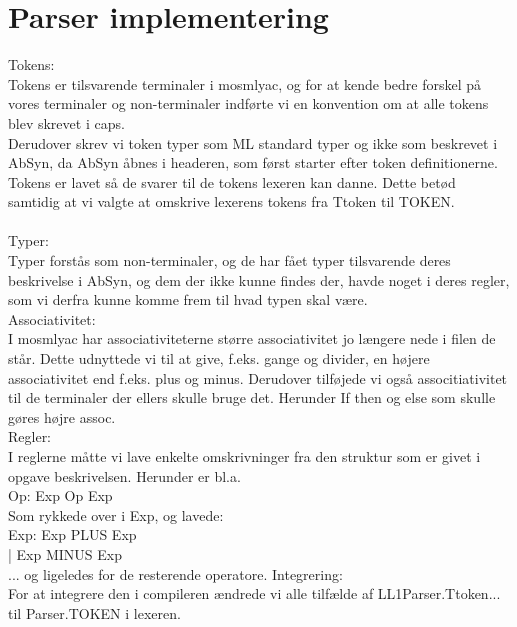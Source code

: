 \documentclass[11pt,a4paper]{article}
\begin{document}
\section*{Parser implementering}
\label{sec:implementation}
Tokens:\\
Tokens er tilsvarende terminaler i mosmlyac, og for at kende bedre forskel på vores terminaler og non-terminaler indførte vi en konvention om at alle tokens blev skrevet i caps.\\
Derudover skrev vi token typer som ML standard typer og ikke som beskrevet i AbSyn, da AbSyn åbnes i headeren, som først starter efter token definitionerne.\\
Tokens er lavet så de svarer til de tokens lexeren kan danne. Dette betød samtidig at vi valgte at omskrive lexerens tokens fra Ttoken til TOKEN.\\
\\
Typer:\\
Typer forstås som non-terminaler, og de har fået typer tilsvarende deres beskrivelse i AbSyn, og dem der ikke kunne findes der, havde noget i deres regler, som vi derfra kunne komme frem til hvad typen skal være.
\\
Associativitet:\\
I mosmlyac har associativiteterne større associativitet jo længere nede i filen de står. Dette udnyttede vi til at give, f.eks. gange og divider, en højere associativitet end f.eks. plus og minus. Derudover tilføjede vi også associtiativitet til de terminaler der ellers skulle bruge det. Herunder If then og else som skulle gøres højre assoc.\\
Regler:\\
I reglerne måtte vi lave enkelte omskrivninger fra den struktur som er givet i opgave beskrivelsen. Herunder er bl.a. \\
Op: Exp Op Exp\\
Som rykkede over i Exp, og lavede:\\
Exp: Exp PLUS Exp\\
   | Exp MINUS Exp\\
... og ligeledes for de resterende operatore.
Integrering:\\
For at integrere den i compileren ændrede vi alle tilfælde af LL1Parser.Ttoken... til Parser.TOKEN i lexeren.
\end{document}
